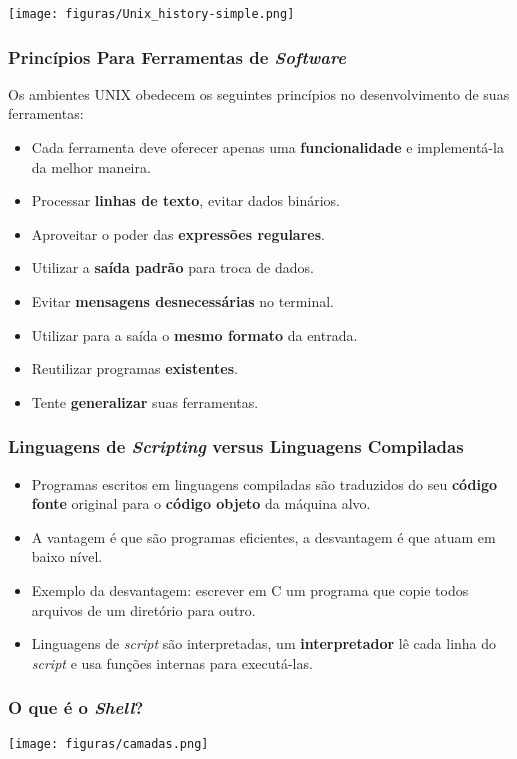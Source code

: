 \documentclass{beamer}
\begin{document}
\begin{frame}
   \texttt{[image: figuras/Unix\_history-simple.png]}
\end{frame}

\begin{frame}
   \frametitle{Princípios Para Ferramentas de \textit{Software}}
   Os ambientes UNIX obedecem os seguintes princípios no desenvolvimento de suas ferramentas:
   \begin{itemize}
      \item Cada ferramenta deve oferecer apenas uma \textbf{funcionalidade} e implementá-la da melhor maneira.
      \item Processar \textbf{linhas de texto}, evitar dados binários.
      \item Aproveitar o poder das \textbf{expressões regulares}.
      \item Utilizar a \textbf{saída padrão} para troca de dados.
      \item Evitar \textbf{mensagens desnecessárias} no terminal.
      \item Utilizar para a saída o \textbf{mesmo formato} da entrada.
      \item Reutilizar programas \textbf{existentes}.
      \item Tente \textbf{generalizar} suas ferramentas.
   \end{itemize}
\end{frame}

\begin{frame}
   \frametitle{Linguagens de \textit{Scripting} versus Linguagens Compiladas}
   \begin{itemize}
      \item Programas escritos em linguagens compiladas são traduzidos do seu \textbf{código fonte} original para o \textbf{código objeto} da máquina alvo.
      \item A vantagem é que são programas eficientes, a desvantagem é que atuam em baixo nível.
      \item Exemplo da desvantagem: escrever em C um programa que copie todos arquivos de um diretório para outro.
      \item Linguagens de \textit{script} são interpretadas, um \textbf{interpretador} lê cada linha do \textit{script} e usa funções internas para executá-las.
   \end{itemize}
\end{frame}

\begin{frame}
   \frametitle{O que é o \textit{Shell}?}
   \centering
   \texttt{[image: figuras/camadas.png]}
\end{frame}
\end{document}
